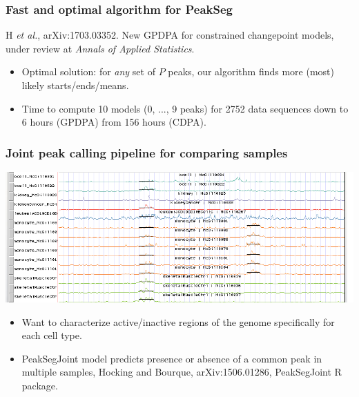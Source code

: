 \documentclass{beamer}
\newcommand{\algo}[1]{\textcolor{#1}{#1}}
\begin{document}
\begin{frame}
  \frametitle{Fast and optimal algorithm for PeakSeg}
  H {\it et al.}, arXiv:1703.03352. New GPDPA for 
  constrained changepoint models, under review at {\it Annals of
    Applied Statistics}.
  \begin{itemize}
  \item Optimal solution: for \emph{any} set of $P$ peaks, our
    algorithm finds more (most) likely starts/ends/means.
  \item Time to compute 10 models (0, ..., 9 peaks) for 2752 data
    sequences down to \textcolor{GPDPA}{6 hours (GPDPA)} from
    \textcolor{CDPA}{156 hours (CDPA)}.
  \end{itemize}

  

\end{frame}

\begin{frame}
  \frametitle{Joint peak calling pipeline for comparing samples}
\includegraphics[width=\textwidth]{PeakSegJoint-monocytes-up}

\begin{itemize}
\item Want to characterize active/inactive regions of the genome
  specifically for each cell type.
\item PeakSegJoint model predicts presence or absence of a common peak
  in multiple samples, Hocking and Bourque, arXiv:1506.01286,
  PeakSegJoint R package.
\end{itemize}
\end{frame}
\end{document}
